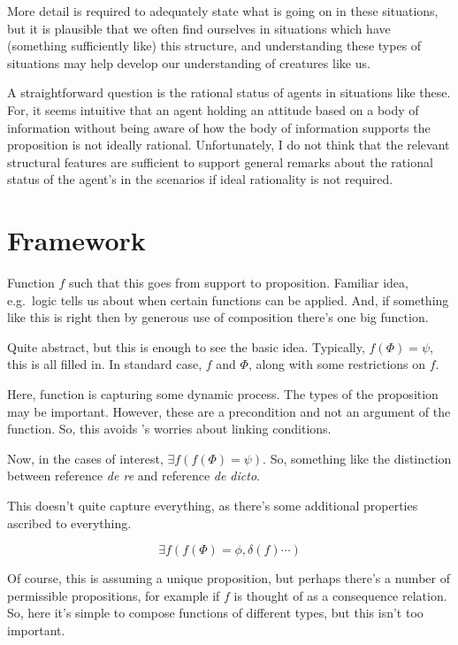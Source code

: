 \documentclass[10pt]{article}
\begin{document}
More detail is required to adequately state what is going on in these situations, but it is plausible that we often find ourselves in situations which have (something sufficiently like) this structure, and understanding these types of situations may help develop our understanding of creatures like us.

A straightforward question is the rational status of agents in situations like these.
For, it seems intuitive that an agent holding an attitude based on a body of information without being aware of how the body of information supports the proposition is not ideally rational.
Unfortunately, I do not think that the relevant structural features are sufficient to support general remarks about the rational status of the agent's in the scenarios if ideal rationality is not required.


\section{Framework}
\label{sec:framework}

Function \(f\) such that this goes from support to proposition.
Familiar idea, e.g.\ logic tells us about when certain functions can be applied.
And, if something like this is right then by generous use of composition there's one big function.

Quite abstract, but this is enough to see the basic idea.
Typically, \(f(\Phi) = \psi\), this is all filled in.
In standard case, \(f\) and \(\Phi\), along with some restrictions on \(f\).

Here, function is capturing some dynamic process.
The types of the proposition may be important.
However, these are a precondition and not an argument of the function.
So, this avoids \citeauthor{Broome:2019aa}'s worries about linking conditions.


Now, in the cases of interest, \(\exists f(f(\Phi) = \psi)\).
So, something like the distinction between reference \emph{de re} and reference \emph{de dicto}.

This doesn't quite capture everything, as there's some additional properties ascribed to everything.

\[\exists f(f(\Phi) = \phi, \delta(f) \cdots)\]

Of course, this is assuming a unique proposition, but perhaps there's a number of permissible propositions, for example if \(f\) is thought of as a consequence relation.
So, here it's simple to compose functions of different types, but this isn't too important.
\end{document}
